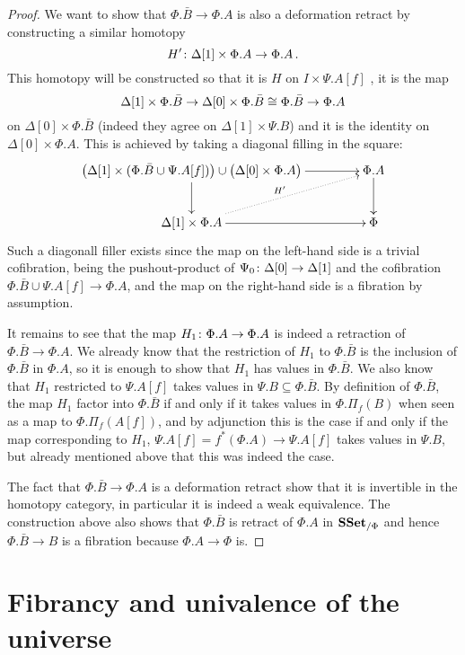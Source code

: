 \documentclass[reqno,10pt,a4paper,oneside,draft]{amsart}
\begin{document}
\begin{proof}
We want to show that $\Phi.\bar{B} \rightarrow \Phi.A$ is also a deformation retract by constructing a similar homotopy 
\[
H' \colon \Delta[1] \times \Phi.A \rightarrow \Phi.A \, .
\] 
This homotopy will be constructed so that it is $H$ on $I \times \Psi.A[f]$ ,  it is the map 
\[
\Delta[1] \times \Phi.\bar{B} \rightarrow \Delta[0]  \times \Phi.\bar{B} \cong \Phi.\bar{B} \rightarrow \Phi.A
\] 
on $\Delta[0] \times \Phi.\bar{B} $ (indeed they agree on $\Delta[1] \times \Psi.B$) and it is the identity on $\Delta[0] \times \Phi.A$.  This is achieved by taking a diagonal filling in the square:
\[
\xymatrix@C=1.5cm{
\big( \Delta[1] \times (\Phi.\bar{B} \cup \Psi.A[f]) \big)  \cup \big( \Delta[0] \times \Phi.A \big) \ar[d] \ar[r] & \Phi.A \ar[d] \\
\Delta[1] \times \Phi.A \ar[r] \ar@{.>}[ur]^{H'} & \Phi
}\]
Such a diagonall filler exists since the map on the left-hand side is a trivial cofibration, being the 
 pushout-product of $\Psi_0 \colon \Delta[0] \rightarrow \Delta[1]$ and the cofibration $\Phi.\bar{B} \cup \Psi.A[f] \rightarrow \Phi.A$, and the map on the right-hand side is a fibration by assumption.

It remains to see that the map $H_{1} \colon \Phi.A \rightarrow \Phi.A$ is indeed a retraction of $\Phi.\bar{B} \rightarrow \Phi.A$. We already know that the restriction of $H_{1}$ to $\Phi.\bar{B}$ is  the inclusion of $\Phi.\bar{B}$ in $\Phi.A$, so it is enough to show that $H_{1}$ has values in $\Phi.\bar{B}$. We also know that $H_{1}$ restricted to $\Psi.A[f]$ takes values in $\Psi.B \subseteq\Phi.\bar{B}$. By definition of $\Phi.\bar{B}$, the map $H_1$ factor into $\Phi.\bar{B}$ if and only if it takes values in $\Phi.\Pi_f(B)$ when seen as a map to $\Phi.\Pi_f(A[f])$, and by adjunction this is the case if and only if the map corresponding to $H_1$, $\Psi.A[f]= f^*(\Phi.A) \rightarrow \Psi.A[f]$ takes values in $\Psi.B$, but already mentioned above that this was indeed the case.

The fact that $\Phi.\bar{B} \rightarrow \Phi.A$ is a deformation retract show that it is invertible in the homotopy category, in particular it is indeed a weak equivalence. The construction above also shows that $\Phi.\bar{B}$ is retract of $\Phi.A$ in $\mathbf{SSet}_{/\Phi}$ and hence $\Phi.\bar{B} \rightarrow B$ is a fibration because $\Phi.A \rightarrow \Phi$ is.
\end{proof}

\newpage

\section{Fibrancy and univalence of the universe}
\label{sec:fibuu}
\end{document}
